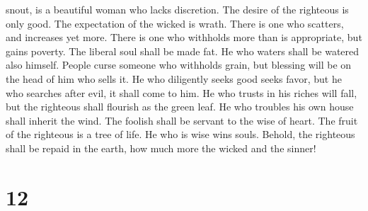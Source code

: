 snout, is a beautiful woman who lacks discretion.  The
desire of the righteous is only good. The expectation of the wicked is
wrath.  There is one who scatters, and increases yet
more. There is one who withholds more than is appropriate, but gains
poverty.  The liberal soul shall be made fat. He who
waters shall be watered also himself.  People curse
someone who withholds grain, but blessing will be on the head of him who
sells it.  He who diligently seeks good seeks favor, but
he who searches after evil, it shall come to him.  He who
trusts in his riches will fall, but the righteous shall flourish as the
green leaf.  He who troubles his own house shall inherit
the wind. The foolish shall be servant to the wise of heart.
 The fruit of the righteous is a tree of life. He who is
wise wins souls.  Behold, the righteous shall be repaid
in the earth, how much more the wicked and the sinner!

\hypertarget{section-11}{%
\section{12}\label{section-11}}

